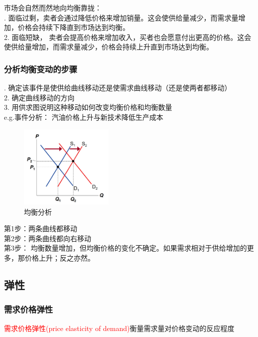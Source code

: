 \documentclass[12pt,a4paper]{article}
\begin{document}
市场会自然而然地向均衡靠拢：\\

. 面临过剩，卖者会通过降低价格来增加销量。这会使供给量减少，而需求量增加，价格会持续下降直到市场达到均衡。\\
2. 面临短缺， 卖者会提高价格来增加收入，买者也会愿意付出更高的价格。这会使供给量增加，而需求量减少，价格会持续上升直到市场达到均衡。\\

\subsubsection{分析均衡变动的步骤}
. 确定该事件是使供给曲线移动还是使需求曲线移动（还是使两者都移动）\\
2. 确定曲线移动的方向\\
3. 用供求图说明这种移动如何改变均衡价格和均衡数量\\

e.g.事件分析： 汽油价格上升与新技术降低生产成本\\

\begin{figure}[H] 
  \centering %
  \includegraphics[width=0.4\textwidth]{均衡分析.png} %
  \caption{均衡分析} %
\end{figure}

\noindent 第1步：两条曲线都移动\\
第2步：两条曲线都向右移动\\
第3步： 均衡数量增加，但均衡价格的变化不确定。如果需求相对于供给增加的更多，那价格上升；反之亦然。\\

\subsection{弹性}

\subsubsection{需求价格弹性}
\textcolor{red}{需求价格弹性(price elasticity of demand)}衡量需求量对价格变动的反应程度\\
\end{document}
